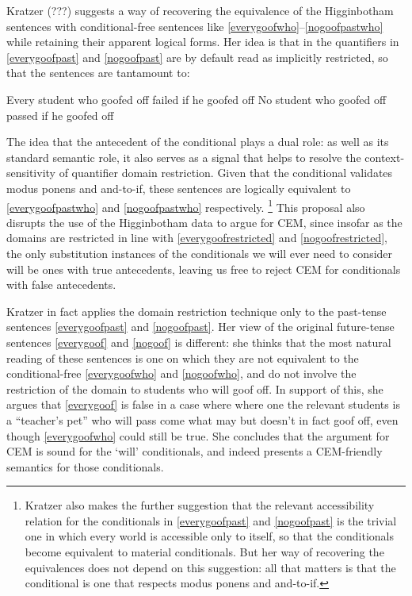 \documentclass[leqno, 11pt, a5paper, openany]{article}
\begin{document}
Kratzer (???) suggests a way of recovering the equivalence of the Higginbotham sentences with conditional-free sentences like \ref{everygoofwho}--\ref{nogoofpastwho} while retaining their apparent logical forms. Her idea is that in the quantifiers in \ref{everygoofpast} and \ref{nogoofpast} are by default read as implicitly restricted, so that the sentences are tantamount to:
\begin{prop}
\nitem \label{everygoofrestricted}
  Every student who goofed off failed if he goofed off
\nitem \label{nogoofrestricted}
  No student who goofed off passed if he goofed off
\end{prop}
The idea that the antecedent of the conditional plays a dual role: as well as its standard semantic role, it also serves as a signal that helps to resolve the context-sensitivity of quantifier domain restriction. Given that the conditional validates modus ponens and and-to-if, these sentences are logically equivalent to \ref{everygoofpastwho}
and \ref{nogoofpastwho} respectively.%
\footnote{Kratzer also makes the further suggestion that the relevant accessibility relation for the conditionals in \ref{everygoofpast} and \ref{nogoofpast} is the trivial one in which every world is accessible only to itself, so that the conditionals become equivalent to material conditionals. But her way of recovering the equivalences does not depend on this suggestion: all that matters is that the conditional is one that respects modus ponens and and-to-if.}
This proposal also disrupts the use of the Higginbotham data to argue for CEM, since insofar as the domains are restricted in line with \ref{everygoofrestricted} and \ref{nogoofrestricted}, the only substitution instances of the conditionals we will ever need to consider will be ones with true antecedents, leaving us free to reject CEM for conditionals with false antecedents.

Kratzer in fact applies the domain restriction technique only to the past-tense sentences \ref{everygoofpast} and \ref{nogoofpast}. Her view of the original future-tense sentences \ref{everygoof} and \ref{nogoof} is different: she thinks that the most natural reading of these sentences is one on which they are not equivalent to the conditional-free \ref{everygoofwho} and \ref{nogoofwho}, and do not involve the restriction of the domain to students who will goof off. In support of this, she argues that \ref{everygoof} is false in a case where where one the relevant students is a ``teacher's pet'' who will pass come what may but doesn't in fact goof off, even though \ref{everygoofwho} could still be true. She concludes that the argument for CEM is sound for the ‘will’ conditionals, and indeed presents a CEM-friendly semantics for those conditionals.
\end{document}
